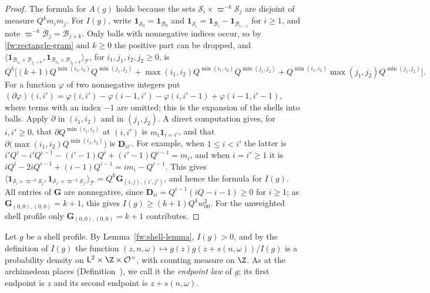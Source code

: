\begin{proof}
The formula for $A(g)$ holds because the sets
$\mathcal S_i\times\varpi^{-k}\mathcal S_j$ are disjoint of measure
$Q^km_im_j$. For $I(g)$, write $\mathbf 1_{\mathcal S_0}=\mathbf
1_{\mathcal B_0}$ and $\mathbf 1_{\mathcal S_i}=\mathbf 1_{\mathcal
B_i}-\mathbf 1_{\mathcal B_{i-1}}$ for $i\ge1$, and note
$\varpi^{-k}\mathcal B_j=\mathcal B_{j+k}$. Only balls with nonnegative
indices occur, so by \eqref{fw:rectangle-gram} and $k\ge0$ the positive
part can be dropped, and
$\langle\mathbf 1_{\mathcal B_{i_1}\times\mathcal B_{j_1+k}},
\mathbf 1_{\mathcal B_{i_2}\times\mathcal B_{j_2+k}}\rangle_{\mathcal T}$,
for $i_1,j_1,i_2,j_2\ge0$, is
\[
 Q^k\bigl[(k+1)Q^{\min(i_1,i_2)}Q^{\min(j_1,j_2)}
 +\max(i_1,i_2)Q^{\min(i_1,i_2)}Q^{\min(j_1,j_2)}
 +Q^{\min(i_1,i_2)}\max(j_1,j_2)Q^{\min(j_1,j_2)}\bigr].
\]
For a function $\varphi$ of two nonnegative integers put
$(\partial\varphi)(i,i')=\varphi(i,i')-\varphi(i-1,i')-\varphi(i,i'-1)
+\varphi(i-1,i'-1)$, where terms with an index $-1$ are omitted; this is
the expansion of the shells into balls. Apply $\partial$ in
$(i_1,i_2)$ and in $(j_1,j_2)$. A direct computation gives, for
$i,i'\ge0$, that $\partial Q^{\min(i_1,i_2)}$ at $(i,i')$ is
$m_i\mathbf 1_{i=i'}$, and that
$\partial\bigl(\max(i_1,i_2)Q^{\min(i_1,i_2)}\bigr)$ is $\mathbf D_{ii'}$.
For example, when $1\le i<i'$ the latter is
$i'Q^i-i'Q^{i-1}-(i'-1)Q^i+(i'-1)Q^{i-1}=m_i$, and when $i=i'\ge1$ it is
$iQ^i-2iQ^{i-1}+(i-1)Q^{i-1}=im_i-Q^{i-1}$. This gives
$\langle\mathbf 1_{\mathcal S_i\times\varpi^{-k}\mathcal S_j},
\mathbf 1_{\mathcal S_{i'}\times\varpi^{-k}\mathcal S_{j'}}\rangle_{\mathcal T}
=Q^k\mathbf G_{(i,j),(i',j')}$, and hence the formula for $I(g)$.
All entries of $\mathbf G$ are nonnegative, since
$\mathbf D_{ii}=Q^{i-1}(iQ-i-1)\ge0$ for $i\ge1$; as
$\mathbf G_{(0,0),(0,0)}=k+1$, this gives $I(g)\ge(k+1)Q^kw_{00}^2$.
For the unweighted shell profile only $\mathbf G_{(0,0),(0,0)}=k+1$
contributes.
\end{proof}

\begin{definition}\label{fw:endpoint-law}
Let $g$ be a shell profile. By Lemma~\ref{fw:shell-lemma}, $I(g)>0$, and by
the definition of $I(g)$ the function
$(z,n,\omega)\mapsto g(z)g(z+s(n,\omega))/I(g)$ is a probability density on
$\mathsf L^2\times\Z\times\mathcal O^\times$, with counting measure on $\Z$.
As at the archimedean places (Definition~), we call it the
\emph{endpoint law} of $g$; its first endpoint is $z$ and its second endpoint
is $z+s(n,\omega)$.
\end{definition}

